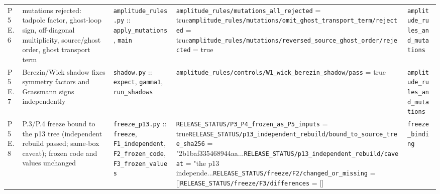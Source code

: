 {\begin{longtable}{@{}p{0.9cm}p{4.1cm}p{3.5cm}p{5.0cm}p{3.0cm}@{}}
P5E.6 & mutations rejected: tadpole factor, ghost-loop sign, off-diagonal multiplicity, source/ghost order, ghost transport term & \texttt{amplitude\_\allowbreak{}rules.\allowbreak{}py} :: \texttt{apply\_\allowbreak{}mutations}, \texttt{main} & \texttt{\allowbreak{}amplitude\_\allowbreak{}rules/\allowbreak{}mutations\_\allowbreak{}all\_\allowbreak{}rejected} = true\newline \texttt{\allowbreak{}amplitude\_\allowbreak{}rules/\allowbreak{}mutations/\allowbreak{}omit\_\allowbreak{}ghost\_\allowbreak{}transport\_\allowbreak{}term/\allowbreak{}rejected} = true\newline \texttt{\allowbreak{}amplitude\_\allowbreak{}rules/\allowbreak{}mutations/\allowbreak{}reversed\_\allowbreak{}source\_\allowbreak{}ghost\_\allowbreak{}order/\allowbreak{}rejected} = true & \texttt{amplitude\_\allowbreak{}rules\_\allowbreak{}and\_\allowbreak{}mutations} \\
P5E.7 & Berezin/Wick shadow fixes symmetry factors and Grassmann signs independently & \texttt{shadow.\allowbreak{}py} :: \texttt{expect}, \texttt{gamma1}, \texttt{run\_\allowbreak{}shadows} & \texttt{\allowbreak{}amplitude\_\allowbreak{}rules/\allowbreak{}controls/\allowbreak{}W1\_\allowbreak{}wick\_\allowbreak{}berezin\_\allowbreak{}shadow/\allowbreak{}pass} = true & \texttt{amplitude\_\allowbreak{}rules\_\allowbreak{}and\_\allowbreak{}mutations} \\
P5E.8 & P.3/P.4 freeze bound to the p13 tree (independent rebuild passed; same-box caveat); frozen code and values unchanged & \texttt{freeze\_\allowbreak{}p13.\allowbreak{}py} :: \texttt{freeze}, \texttt{F1\_\allowbreak{}independent}, \texttt{F2\_\allowbreak{}frozen\_\allowbreak{}code}, \texttt{F3\_\allowbreak{}frozen\_\allowbreak{}values} & \texttt{RELEASE\_\allowbreak{}STATUS/\allowbreak{}P3\_\allowbreak{}P4\_\allowbreak{}frozen\_\allowbreak{}as\_\allowbreak{}P5\_\allowbreak{}inputs} = true\newline \texttt{RELEASE\_\allowbreak{}STATUS/\allowbreak{}p13\_\allowbreak{}independent\_\allowbreak{}rebuild/\allowbreak{}bound\_\allowbreak{}to\_\allowbreak{}source\_\allowbreak{}tree\_\allowbreak{}sha256} = "2b1baf335468944aa.\allowbreak{}.\allowbreak{}.\allowbreak{}\newline \texttt{RELEASE\_\allowbreak{}STATUS/\allowbreak{}p13\_\allowbreak{}independent\_\allowbreak{}rebuild/\allowbreak{}caveat} = "the p13 independe.\allowbreak{}.\allowbreak{}.\allowbreak{}\newline \texttt{RELEASE\_\allowbreak{}STATUS/\allowbreak{}freeze/\allowbreak{}F2/\allowbreak{}changed\_\allowbreak{}or\_\allowbreak{}missing} = []\newline \texttt{RELEASE\_\allowbreak{}STATUS/\allowbreak{}freeze/\allowbreak{}F3/\allowbreak{}differences} = [] & \texttt{freeze\_\allowbreak{}binding} \\

\end{longtable}}
